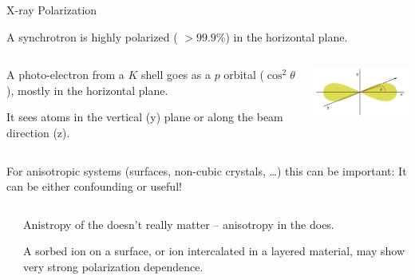 \begin{slide}{X-ray Polarization}

  A synchrotron is highly polarized ( $ > 99.9\% $) in the horizontal
  plane.

\begin{columns}[T]
\begin{column}{58mm}

    \vmm

    A photo-electron from a $K$ shell goes as a $p$ orbital ($\cos^2\theta
    $), mostly in the horizontal plane.
    \vmm

    It {} sees atoms in the vertical (y) plane or along the
    beam direction (z).

  \end{column}
  \begin{column}{52mm}
    \includegraphics[width=50mm]{figs/theory/dipole}
  \end{column}
  \end{columns}

  \begin{cenpage}{110mm}

  For anisotropic systems (surfaces, non-cubic crystals, \ldots) this can
  be important:  It can be either confounding or useful!

  \vmm\vmm

  \begin{columns}
    \begin{column}{20mm}

     \end{column}
     \begin{column}{75mm}
       Anistropy of the {} doesn't really matter
       -- anisotropy in the {} does.

       \vmm

       A sorbed ion on a surface, or ion intercalated in a layered
       material, may show very strong polarization dependence.

     \end{column}
 \end{columns}

 \end{cenpage}

\vfill
\end{slide}
